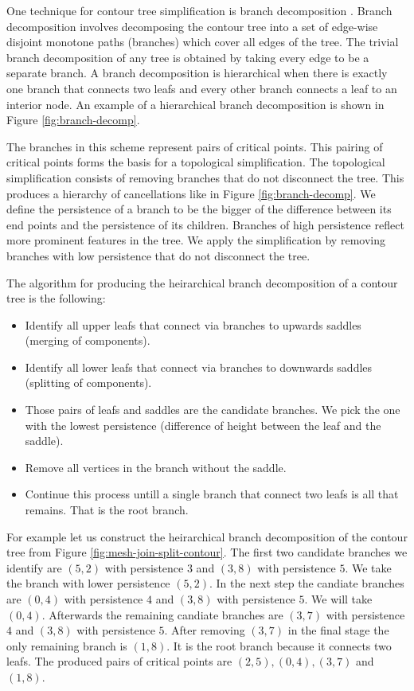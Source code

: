 One technique for contour tree simplification is branch decomposition \cite{ct-branch-decomp}. Branch decomposition involves decomposing the contour tree into a set of edge-wise disjoint monotone paths (branches) which cover all edges of the tree. The trivial branch decomposition of any tree is obtained by taking every edge to be a separate branch. A branch decomposition is hierarchical when there is exactly one branch that connects two leafs and every other branch connects a leaf to an interior node. An example of a hierarchical branch decomposition is shown in Figure \ref{fig:branch-decomp}.

The branches in this scheme represent pairs of critical points. This pairing of critical points forms the basis for a topological simplification. The topological simplification consists of removing branches that do not disconnect the tree. This produces a hierarchy of cancellations like in Figure \ref{fig:branch-decomp}. We define the persistence of a branch to be the bigger of the difference between its end points and the persistence of its children. Branches of high persistence reflect more prominent features in the tree. We apply the simplification by removing branches with low persistence that do not disconnect the tree.

The algorithm for producing the heirarchical branch decomposition of a contour tree is the following:

\begin{itemize}
    \item Identify all upper leafs that connect via branches to upwards saddles (merging of components).
    \item Identify all lower leafs that connect via branches to downwards saddles (splitting of components).
    \item Those pairs of leafs and saddles are the candidate branches. We pick the one with the lowest persistence (difference of height between the leaf and the saddle).
    \item Remove all vertices in the branch without the saddle.
    \item Continue this process untill a single branch that connect two leafs is all that remains. That is the root branch.
\end{itemize}

For example let us construct the heirarchical branch decomposition of the contour tree from Figure \ref{fig:mesh-join-split-contour}. The first two candidate branches we identify are $(5, 2)$ with persistence $3$ and $(3, 8)$ with persistence $5$. We take the branch with lower persistence $(5, 2)$. In the next step the candiate branches are $(0, 4)$ with persistence $4$ and $(3, 8)$ with persistence $5$. We will take $(0, 4)$.
Afterwards the remaining candiate branches are $(3, 7)$ with persistence $4$ and $(3, 8)$ with persistence $5$. After removing $(3, 7)$ in the final stage the only remaining branch is $(1, 8)$. It is the root branch because it connects two leafs.
The produced pairs of critical points are $(2, 5), (0, 4), (3, 7)$ and $(1,8)$.

